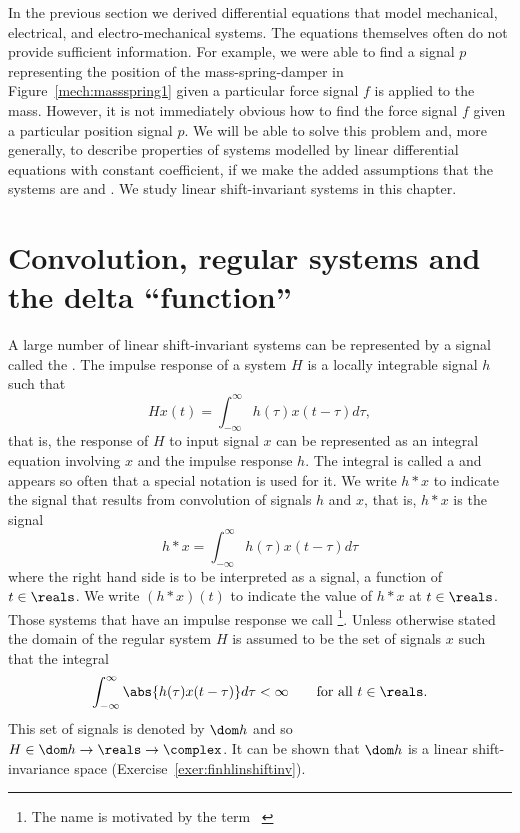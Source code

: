 
In the previous section we derived differential equations that model mechanical, electrical, and electro-mechanical systems.  The equations themselves often do not provide sufficient information.  For example, we were able to find a signal $p$ representing the position of the mass-spring-damper in Figure~\ref{mech:massspring1} given a particular force signal $f$ is applied to the mass.  However, it is not immediately obvious how to find the force signal $f$ given a particular position signal $p$.  We will be able to solve this problem and, more generally, to describe properties of systems modelled by linear differential equations with constant coefficient, if we make the added assumptions that the systems are  and .  We study linear shift-invariant systems in this chapter.  %

\section{Convolution, regular systems and the delta ``function''} \label{sec:conv-regul-syst}

A large number of linear shift-invariant systems can be represented by a signal called the .  The impulse response of a system $H$ is a locally integrable signal $h$ such that
\[
Hx(t) = \int_{-\infty}^{\infty} h(\tau) x(t - \tau) d\tau,
\]
that is, the response of $H$ to input signal $x$ can be represented as an integral equation involving $x$ and the impulse response $h$.  The integral is called a  and appears so often that a special notation is used for it.  We write $h * x$ to  indicate the signal that results from convolution of signals $h$ and $x$, that is, $h * x$ is the signal
\[
h * x = \int_{-\infty}^{\infty} h(\tau) x(t - \tau) d\tau
\]
where the right hand side is to be interpreted as a signal, a function of $t \in \reals$.  We write $(h*x)(t)$ to indicate the value of $h*x$ at $t \in \reals$.  
Those systems that have an impulse response we call \footnote{The name  is motivated by the term ~\citep{Zemanian_dist_theory_1965}}.  Unless otherwise stated the domain of the regular system $H$ is assumed to be the set of signals $x$ such that the integral
\[
\int_{-\infty}^{\infty} \abs{h(\tau) x(t - \tau)} d\tau < \infty \qquad \text{for all $t \in \reals$}.
\]
This set of signals is denoted by $\dom h$ and so $H \in \dom h \to \reals \to \complex$.  %
It can be shown that $\dom h$ is a linear shift-invariance space (Exercise~\ref{exer:finhlinshiftinv}).

